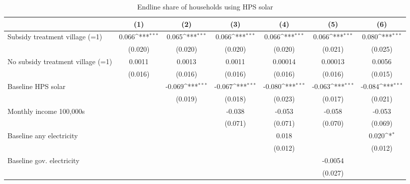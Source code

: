 \begin{table}[htbp]\centering
\def\sym#1{\ifmmode^{#1}\else\(^{#1}\)\fi}
\caption{Endline share of households using HPS solar}
\begin{tabular*}{1\hsize}{@{\hskip\tabcolsep\extracolsep\fill}l*{6}{c}}
\toprule
                &\multicolumn{1}{c}{(1)}         &\multicolumn{1}{c}{(2)}         &\multicolumn{1}{c}{(3)}         &\multicolumn{1}{c}{(4)}         &\multicolumn{1}{c}{(5)}         &\multicolumn{1}{c}{(6)}         \\
\midrule
Subsidy treatment village (=1)&    0.066\sym{***}&    0.065\sym{***}&    0.066\sym{***}&    0.066\sym{***}&    0.066\sym{***}&    0.080\sym{***}\\
                &  (0.020)         &  (0.020)         &  (0.020)         &  (0.020)         &  (0.021)         &  (0.025)         \\
No subsidy treatment village (=1)&   0.0011         &   0.0013         &   0.0011         &  0.00014         &  0.00013         &   0.0056         \\
                &  (0.016)         &  (0.016)         &  (0.016)         &  (0.016)         &  (0.016)         &  (0.015)         \\
Baseline HPS solar&                  &   -0.069\sym{***}&   -0.067\sym{***}&   -0.080\sym{***}&   -0.063\sym{***}&   -0.084\sym{***}\\
                &                  &  (0.019)         &  (0.018)         &  (0.023)         &  (0.017)         &  (0.021)         \\
Monthly income 100,000s&                  &                  &   -0.038         &   -0.053         &   -0.058         &   -0.053         \\
                &                  &                  &  (0.071)         &  (0.071)         &  (0.070)         &  (0.069)         \\
Baseline any electricity&                  &                  &                  &    0.018         &                  &    0.020\sym{*}  \\
                &                  &                  &                  &  (0.012)         &                  &  (0.012)         \\
Baseline gov. electricity&                  &                  &                  &                  &  -0.0054         &                  \\
                &                  &                  &                  &                  &  (0.027)         &                  \\

\end{tabular*}
\end{table}
